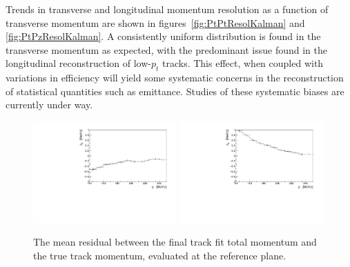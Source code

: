   Trends in transverse and longitudinal momentum resolution as a function of transverse momentum are shown in figures~\ref{fig:PtPtResolKalman} and \ref{fig:PtPzResolKalman}. A consistently uniform distribution is found in the transverse momentum as expected, with the predominant issue found in the longitudinal reconstruction of low-$p_t$ tracks. This effect, when coupled with variations in efficiency will yield some systematic concerns in the reconstruction of statistical quantities such as emittance. Studies of these systematic biases are currently under way.

  \begin{figure}[hbt]
    \begin{center}
      \includegraphics[width=0.49\textwidth, angle=0]{08-Performance/upstream_p_bias_p.pdf}
      \includegraphics[width=0.49\textwidth, angle=0]{08-Performance/downstream_p_bias_p.pdf}
      \caption{\label{fig:pBiasKalman} The mean residual between the final track fit total momentum and the true track momentum, evaluated at the reference plane.}
    \end{center}
  \end{figure}


